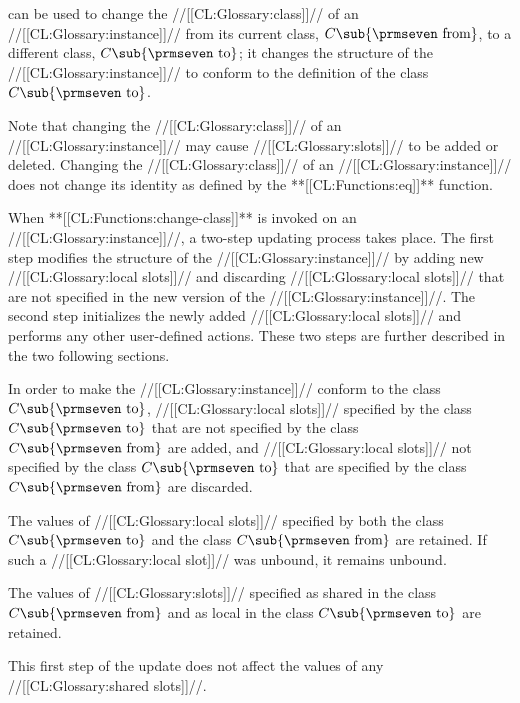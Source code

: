 
              
 can be used to change the //[[CL:Glossary:class]]// 
of an //[[CL:Glossary:instance]]// from its current class, $C\sub {\hbox{{\prmseven from}}}$,
to a different class, $C\sub {\hbox{{\prmseven to}}}$; it changes the
structure of the //[[CL:Glossary:instance]]// to conform to the definition of the class
$C\sub {\hbox{{\prmseven to}}}$.

Note that changing the //[[CL:Glossary:class]]// of an //[[CL:Glossary:instance]]// may cause
//[[CL:Glossary:slots]]// to be added or deleted.  Changing the //[[CL:Glossary:class]]// of an
//[[CL:Glossary:instance]]// does not change its identity as defined by the
**[[CL:Functions:eq]]** function.
      
When **[[CL:Functions:change-class]]** is invoked on an //[[CL:Glossary:instance]]//, a two-step
updating process takes place.  The first step modifies the structure of
the //[[CL:Glossary:instance]]// by adding new //[[CL:Glossary:local slots]]// and discarding 
//[[CL:Glossary:local slots]]// that are not specified in the new version of the //[[CL:Glossary:instance]]//.
The second step initializes the newly added //[[CL:Glossary:local slots]]// and performs 
any other user-defined actions. These two steps are further described in the 
two following sections.


In order to make the //[[CL:Glossary:instance]]// conform to the class $C\sub
{\hbox{{\prmseven to}}}$, //[[CL:Glossary:local slots]]// specified by the class $C\sub
{\hbox{{\prmseven to}}}$ that are not specified by the class $C\sub
{\hbox{{\prmseven from}}}$ are added, and //[[CL:Glossary:local slots]]// not specified by
the class $C\sub {\hbox{{\prmseven to}}}$ that are specified by the
class $C\sub {\hbox{{\prmseven from}}}$ are discarded.

The values of //[[CL:Glossary:local slots]]// specified by both the class $C\sub
{\hbox{{\prmseven to}}}$ and the class $C\sub {\hbox{{\prmseven
from}}}$ are retained. If such a //[[CL:Glossary:local slot]]// was unbound, it remains
unbound.

The values of //[[CL:Glossary:slots]]// specified as shared in the class $C\sub
{\hbox{{\prmseven from}}}$ and as local in the class $C\sub
{\hbox{{\prmseven to}}}$ are retained.

This first step of the update does not affect the values of any 
//[[CL:Glossary:shared slots]]//.

